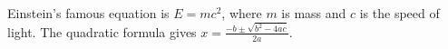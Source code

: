 \documentclass{article}
\begin{document}
Einstein's famous equation is $E = mc^2$, where $m$ is mass
and $c$ is the speed of light. The quadratic formula gives
$x = \frac{-b \pm \sqrt{b^2 - 4ac}}{2a}$.
\end{document}
